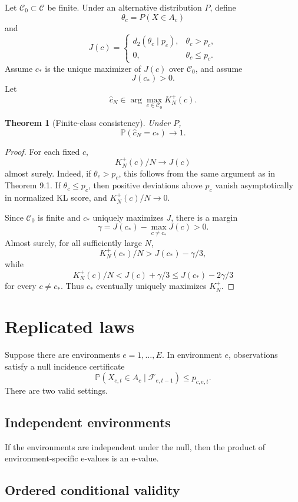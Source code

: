 \documentclass[11pt]{article}
\newtheorem{theorem}{Theorem}[section]
\begin{document}
Let $\mathcal C_0\subset\mathcal C$ be finite. Under an alternative distribution $P$, define
\[
\theta_c=P(X\in A_c)
\]
and
\[
J(c)=
\begin{cases}
d_2(\theta_c\mid p_c),&\theta_c>p_c,\\
0,&\theta_c\le p_c.
\end{cases}
\]
Assume $c_*$ is the unique maximizer of $J(c)$ over $\mathcal C_0$, and assume
\[
J(c_*)>0.
\]
Let
\[
\widehat c_N\in\arg\max_{c\in\mathcal C_0}K_N^+(c).
\]

\begin{theorem}[Finite-class consistency]
Under $P$,
\[
\mathbb P(\widehat c_N=c_*)\to1.
\]
\end{theorem}

\begin{proof}
For each fixed $c$,
\[
K_N^+(c)/N\to J(c)
\]
almost surely. Indeed, if $\theta_c>p_c$, this follows from the same argument as in Theorem 9.1. If $\theta_c\le p_c$, then positive deviations above $p_c$ vanish asymptotically in normalized KL score, and $K_N^+(c)/N\to0$.

Since $\mathcal C_0$ is finite and $c_*$ uniquely maximizes $J$, there is a margin
\[
\gamma=J(c_*)-\max_{c\ne c_*}J(c)>0.
\]
Almost surely, for all sufficiently large $N$,
\[
K_N^+(c_*)/N>J(c_*)-\gamma/3,
\]
while
\[
K_N^+(c)/N<J(c)+\gamma/3\le J(c_*)-2\gamma/3
\]
for every $c\ne c_*$. Thus $c_*$ eventually uniquely maximizes $K_N^+$.
\end{proof}

\section{Replicated laws}

Suppose there are environments $e=1,\dots,E$. In environment $e$, observations satisfy a null incidence certificate
\[
\mathbb P(X_{e,t}\in A_c\mid\mathcal F_{e,t-1})\le p_{c,e,t}.
\]
There are two valid settings.

\subsection{Independent environments}

If the environments are independent under the null, then the product of environment-specific e-values is an e-value.

\subsection{Ordered conditional validity}
\end{document}
